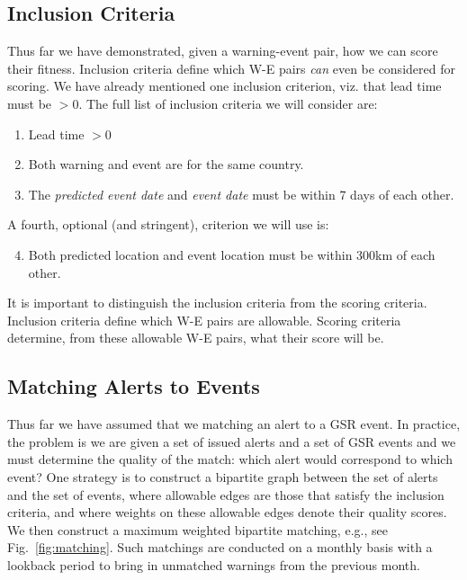\subsection{Inclusion Criteria}
Thus far we have demonstrated, given a warning-event pair, how we can
score their fitness. Inclusion criteria define which W-E pairs {\it can}
even be considered for scoring. We have already mentioned one inclusion
criterion, viz. that lead time must be $> 0$. The full list of inclusion
criteria we will consider are:
\begin{enumerate}
\item Lead time $> 0$
\item Both warning and event are for the same country.
\item The {\it predicted event date} and {\it event date} must be
within 7 days of each other.
\end{enumerate}
A fourth, optional (and stringent), criterion we will use is:
\begin{enumerate}
  \setcounter{enumi}{3}
  \item Both predicted location and event location must be within 300km of
each other.
\end{enumerate}
It is important to distinguish the inclusion criteria from the scoring
criteria. Inclusion criteria define which W-E pairs are allowable.
Scoring criteria determine, from these allowable W-E pairs, what their
score will be.

\subsection{Matching Alerts to Events}
Thus far we have assumed that we matching an alert to a GSR event. In
practice, the problem is we are given a set of issued alerts  and a set
of GSR events and we must determine the quality of the match: which
alert would correspond to which event? One strategy is to construct
a bipartite graph between the set of alerts and the set of events,
where allowable edges are those that satisfy the inclusion criteria, and
where weights on these allowable edges denote their quality scores.
We then construct
a maximum weighted bipartite matching, e.g., see
Fig.~\ref{fig:matching}. Such matchings are conducted on a monthly basis
with a lookback period to bring in unmatched warnings from the previous month.

